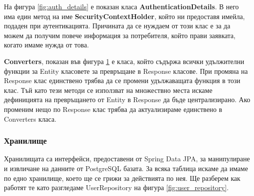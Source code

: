         На фигура \ref{fig:auth_details} е показан класа \textbf{AuthenticationDetails}. В него има един метод на име \textbf{SecurityContextHolder}, който ни предоставя имейла, подаден при аутентикацията. Причината да се нуждаем от този клас е за да можем да получим повече информация за потребителя, който прави заявката, когато имаме нужда от това.
        
        \begin{figure}[h]
            \centering
            \caption{}
            \label{fig:converters}
        \end{figure}
        
        \textbf{Converters}, показан във фигура \ref{fig:converters} е класа, който съдържа всички удължителни функции за Entity класовете за превръщане в Response класове.  При промяна на Response клас единствено трябва да се промени удължаващата функция в този клас. Тъй като тези методи се използват на множествно места искаме дефиницията на превръщането от Entity в Response да бъде централизирано. Ако променим нещо по Response клас трябва да актуализираме единствено в Converters класа.
        
        
        \subsubsection{Хранилище}
        Хранилищата са интерфейси, предоставени от Spring Data JPA, за манипулиране и извличане на данните от PostgreSQL базата. За всяка таблица искаме да имаме по едно хранилище, което ще се грижи за действията по нея. Ще разберем как работят те като разгледаме UserRepository на фигура \ref{fig:user_repository}.
        
